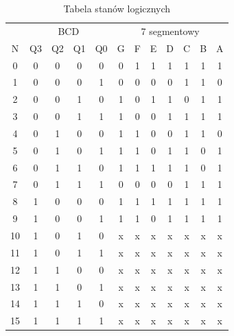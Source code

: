 \documentclass[a4paper,oneside]{report}
\begin{document}
\begin{table}[htbp] \caption{Tabela stanów logicznych} \label{decoder-table} \centering
\begin{tabular}{|c|cccc|ccccccc|} 
\hline 
& \multicolumn{4}{c|}{BCD} & \multicolumn{7}{c|}{7 segmentowy} \\
N  & Q3   & Q2   & Q1   & Q0  & G   & F  & E  & D  & C  & B  & A  \\ \hline
0  & 0    & 0    & 0    & 0   & 0   & 1  & 1  & 1  & 1  & 1  & 1  \\
1  & 0    & 0    & 0    & 1   & 0   & 0  & 0  & 0  & 1  & 1  & 0  \\
2  & 0    & 0    & 1    & 0   & 1   & 0  & 1  & 1  & 0  & 1  & 1  \\
3  & 0    & 0    & 1    & 1   & 1   & 0  & 0  & 1  & 1  & 1  & 1  \\
4  & 0    & 1    & 0    & 0   & 1   & 1  & 0  & 0  & 1  & 1  & 0  \\
5  & 0    & 1    & 0    & 1   & 1   & 1  & 0  & 1  & 1  & 0  & 1  \\
6  & 0    & 1    & 1    & 0   & 1   & 1  & 1  & 1  & 1  & 0  & 1  \\
7  & 0    & 1    & 1    & 1   & 0   & 0  & 0  & 0  & 1  & 1  & 1  \\
8  & 1    & 0    & 0    & 0   & 1   & 1  & 1  & 1  & 1  & 1  & 1  \\
9  & 1    & 0    & 0    & 1   & 1   & 1  & 0  & 1  & 1  & 1  & 1  \\
10 & 1    & 0    & 1    & 0   & x   & x  & x  & x  & x  & x  & x  \\
11 & 1    & 0    & 1    & 1   & x   & x  & x  & x  & x  & x  & x  \\
12 & 1    & 1    & 0    & 0   & x   & x  & x  & x  & x  & x  & x  \\
13 & 1    & 1    & 0    & 1   & x   & x  & x  & x  & x  & x  & x  \\
14 & 1    & 1    & 1    & 0   & x   & x  & x  & x  & x  & x  & x  \\
15 & 1    & 1    & 1    & 1   & x   & x  & x  & x  & x  & x  & x  \\ \hline
\end{tabular}
\end{table}
\end{document}
